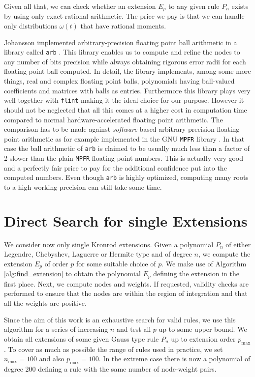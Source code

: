 \documentclass[a4paper,10pt]{article}
\begin{document}
Given all that, we can check whether an extension $E_p$ to any given rule $P_n$
exists by using only exact rational arithmetic. The price we pay is that we can
handle only distributions $\omega(t)$ that have rational moments.

Johansson implemented arbitrary-precision floating point ball arithmetic in a
library called \texttt{arb} \cite{arb}. This library enables us to compute and
refine the nodes to any number of bits precision while always obtaining rigorous
error radii for each floating point ball computed. In detail, the library implements,
among some more things, real and complex floating point balls, polynomials having
ball-valued coefficients and matrices with balls as entries. Furthermore this library plays
very well together with \texttt{flint} making it the ideal choice for our purpose.
However it should not be neglected that all this comes at a higher cost
in computation time compared to normal hardware-accelerated floating point arithmetic.
The comparison has to be made against \emph{software} based arbitrary precision floating
point arithmetic as for example implemented in the GNU \texttt{MPFR} library \cite{mpfr}.
In that case the ball arithmetic of \texttt{arb} is claimed to be usually much less than
a factor of 2 slower than the plain \texttt{MPFR} floating point numbers. This is
actually very good and a perfectly fair price to pay for the additional confidence put
into the computed numbers. Even though \texttt{arb} is highly optimized, computing many
roots to a high working precision can still take some time.


\FloatBarrier
\section{Direct Search for single Extensions}

We consider now only single Kronrod extensions. Given a polynomial
$P_n$ of either Legendre, Chebyshev, Laguerre or Hermite type and of degree $n$, we compute
the extension $E_p$ of order $p$ for some suitable choice of $p$. We make use of Algorithm
\ref{alg:find_extension} to obtain the polynomial $E_p$ defining the extension in
the first place. Next, we compute nodes and weights. If requested, validity checks
are performed to ensure that the nodes are within the region of integration
and that all the weights are positive.

Since the aim of this work is an exhaustive search for valid rules, we use
this algorithm for a series of increasing $n$ and test all $p$ up to some
upper bound. We obtain all extensions of
some given Gauss type rule $P_n$ up to extension order $p_{\textrm{max}}$.
To cover as much as possible the range of rules used in practice, we set
$n_{\mathrm{max}} = 100$ and also $p_{\textrm{max}} = 100$. In the extreme case
there is now a polynomial of degree $200$ defining a rule with the same number
of node-weight pairs.
\end{document}
